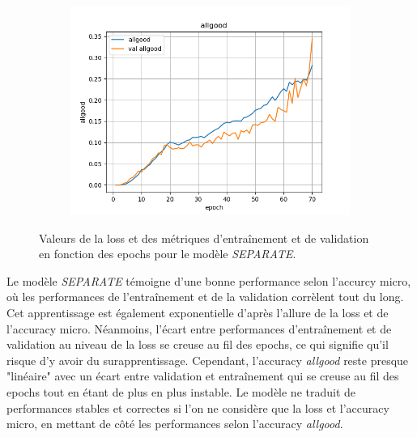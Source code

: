 \documentclass[a4paper]{article}
\begin{document}
\begin{figure}[H]
\begin{subfigure}{0.32\textwidth}
        \includegraphics[width=\linewidth]{../logs/separate/allgood.png}
    \end{subfigure}
    \caption{Valeurs de la loss et des métriques d'entraînement et de validation en fonction des epochs 
            pour le modèle \textit{SEPARATE}.}
    \label{fig: results separate}
\end{figure}

Le modèle \textit{SEPARATE} témoigne d'une bonne performance selon l'accurcy micro, où les performances de l'entraînement et de la validation corrèlent tout du long. Cet apprentissage est également exponentielle d'après l'allure de la loss et de l'accuracy micro. Néanmoins, l'écart entre performances d'entraînement et de validation au niveau de la loss se creuse au fil des epochs, ce qui signifie qu'il risque d'y avoir du surapprentissage. Cependant, l'accuracy \textit{allgood} reste presque "linéaire" avec un écart entre
validation et entraînement qui se creuse au fil des epochs tout en étant de plus en plus instable. Le modèle ne traduit de performances stables et correctes si l'on ne considère que la loss et l'accuracy micro, en mettant de côté les performances selon l'accuracy \textit{allgood}.
\end{document}
